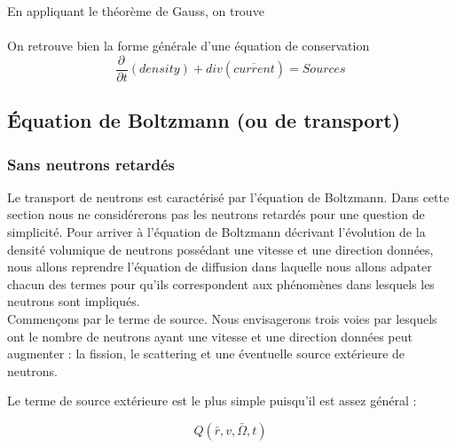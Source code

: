 En appliquant le théorème de Gauss, on trouve\\

\ \\

On retrouve bien la forme générale d'une équation de conservation
\begin{equation}
\frac{{\partial \,}}{{\partial t}}\left( {density} \right) + div(\overline {current} ) = Sources
\end{equation}


\subsection{Équation de Boltzmann (ou de transport)}
\subsubsection{Sans neutrons retardés}

Le transport de neutrons est caractérisé par l'équation de Boltzmann. Dans cette section nous
ne considérerons pas les neutrons retardés pour une question de simplicité. Pour arriver
à l'équation de Boltzmann décrivant l'évolution de la densité volumique de neutrons
possédant une vitesse et une direction données, nous allons reprendre l'équation de diffusion dans laquelle
nous allons adpater chacun des termes pour qu'ils correspondent aux phénomènes dans lesquels
les neutrons sont impliqués.\\

Commençons par le terme de source. Nous envisagerons trois voies par lesquels ont le nombre
de neutrons ayant une vitesse et une direction données peut augmenter : la fission, le
scattering et une éventuelle source extérieure de neutrons.

Le terme de source extérieure est le plus simple puisqu'il est assez général :

\begin{equation}
Q(\bar r,v,\bar \Omega ,t)
\end{equation}

